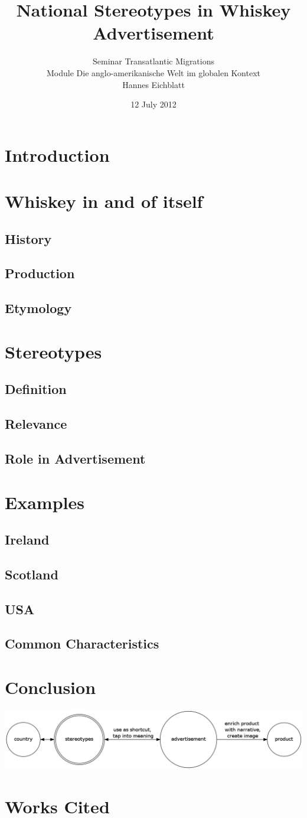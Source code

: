 \documentclass[10pt]{article}
\title{National Stereotypes in Whiskey Advertisement}
\author{Seminar Transatlantic Migrations \\ Module Die anglo-amerikanische Welt im globalen Kontext \\ Hannes Eichblatt}
\date{12 July 2012}
\begin{document}
\maketitle

\section{Introduction}
\subsection{}
\section{Whiskey in and of itself}
\subsection{History}
\subsection{Production}
\subsection{Etymology}
\section{Stereotypes}
\subsection{Definition}
\subsection{Relevance}
\subsection{Role in Advertisement}
\section{Examples}
\subsection{Ireland}
\subsection{Scotland}
\subsection{USA}
\subsection{Common Characteristics}
\section{Conclusion}
\includegraphics[scale=.4]{concepts.png}
\section{Works Cited}

\end{document}
